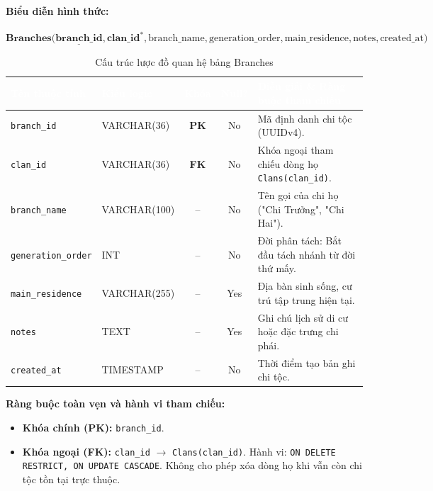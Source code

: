 \paragraph{Biểu diễn hình thức:}
\[
\textbf{Branches}\big(
\underline{\textbf{branch\_id}}, \textbf{clan\_id}^*, \text{branch\_name}, \text{generation\_order}, \text{main\_residence}, \text{notes}, \text{created\_at}
\big)
\]

\begin{table}[H]
    \centering
    \small
    \renewcommand{\arraystretch}{1.2}
    \begin{tabularx}{\textwidth}{p{3.2cm} p{2.6cm} c c X}
        \toprule
        \rowcolor{tableheader}\textcolor{white}{\textbf{Tên thuộc tính}} & \textcolor{white}{\textbf{Kiểu logic}} & \textcolor{white}{\textbf{Khóa}} & \textcolor{white}{\textbf{Null?}} & \textcolor{white}{\textbf{Diễn giải \& Ràng buộc tham chiếu}} \\
        \midrule
        \rowcolor{tablerowalt}
        \texttt{branch\_id} & VARCHAR(36) & \textcolor{pkcolor}{\textbf{PK}} & No & Mã định danh chi tộc (UUIDv4). \\
        \texttt{clan\_id} & VARCHAR(36) & \textcolor{fkcolor}{\textbf{FK}} & No & Khóa ngoại tham chiếu dòng họ \texttt{Clans(clan\_id)}. \\
        \rowcolor{tablerowalt}
        \texttt{branch\_name} & VARCHAR(100) & -- & No & Tên gọi của chi họ ("Chi Trưởng", "Chi Hai"). \\
        \texttt{generation\_order} & INT & -- & No & Đời phân tách: Bắt đầu tách nhánh từ đời thứ mấy. \\
        \rowcolor{tablerowalt}
        \texttt{main\_residence} & VARCHAR(255) & -- & Yes & Địa bàn sinh sống, cư trú tập trung hiện tại. \\
        \texttt{notes} & TEXT & -- & Yes & Ghi chú lịch sử di cư hoặc đặc trưng chi phái. \\
        \rowcolor{tablerowalt}
        \texttt{created\_at} & TIMESTAMP & -- & No & Thời điểm tạo bản ghi chi tộc. \\
        \bottomrule
    \end{tabularx}
    \caption{Cấu trúc lược đồ quan hệ bảng Branches}
    \label{tab:schema_branches}
\end{table}

\noindent\textbf{Ràng buộc toàn vẹn và hành vi tham chiếu:}
\begin{itemize}[noitemsep,topsep=2pt]
    \item \textbf{Khóa chính (PK):} \texttt{branch\_id}.
    \item \textbf{Khóa ngoại (FK):} \texttt{clan\_id} $\rightarrow$ \texttt{Clans(clan\_id)}. Hành vi: \texttt{ON DELETE RESTRICT, ON UPDATE CASCADE}. Không cho phép xóa dòng họ khi vẫn còn chi tộc tồn tại trực thuộc.
\end{itemize}

